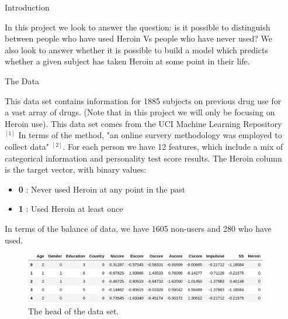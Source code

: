 \documentclass[6pt, final, xcolor=table]{beamer}
\newlength{\sepwidth}
\newlength{\colwidth}
\newcommand{\separatorcolumn}{\begin{column}{\sepwidth}\end{column}}
\begin{document}
\begin{frame}[t]
\begin{columns}[t]
\separatorcolumn

\begin{column}{\colwidth}

  \begin{alertblock}{Introduction}

   In this project we look to answer the question: is it possible to distinguish
   between people who have used Heroin Vs people who have never used? We also look 
   to answer whether it is possible to build a model which predicts whether a given subject has taken
   Heroin at some point in their life.
  \end{alertblock}

  \begin{block}{The Data}

 This data set contains information for 1885 
 subjects on previous drug use for a vast array of drugs. (Note that in this project we will only be focusing on Heroin use). This data set comes from the UCI Machine Learning Repository$^{[1]}$
 In terms of the method, "an online survery methodology was employed to collect data" $^{[2]}$.
 For each person we have 12 features, which include a mix of categorical
 information and personality test score results.
 The Heroin column is the target vector, with binary values:
 \begin{itemize}
     \item  \textbf{0} : Never used Heroin at any point in the past
     \item  \textbf{1} : Used Heroin at least once 
 \end{itemize}
In terms of the balance of data, we have 1605 non-users and 280 who have used.
 \begin{figure}[h!]
    \centering
     \includegraphics[scale=1.1]{df.png}
    \caption{The head of the data set.}
    \label{fig:dataset}
    \end{figure}
    

\end{block}
\end{column}
\end{columns}
\end{frame}
\end{document}
